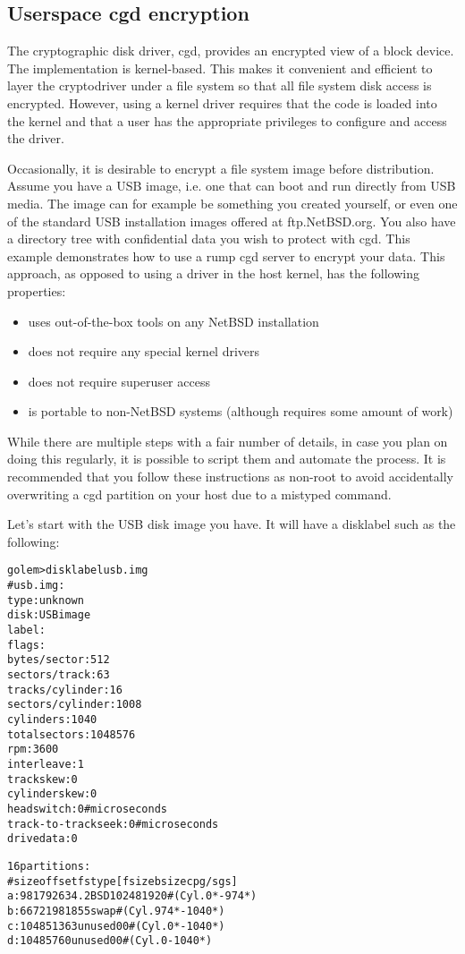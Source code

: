 \subsection{Userspace cgd encryption}
\label{sect:cgdencrypt}

The cryptographic disk driver, cgd,
provides an encrypted view of a block device.  The implementation
is kernel-based.  This makes it convenient and efficient to layer
the cryptodriver under a file system so that all file system disk
access is encrypted.  However, using a kernel driver requires that
the code is loaded into the kernel and that a user has the appropriate
privileges to configure and access the driver.

Occasionally, it is desirable to encrypt a file system image before
distribution.  Assume you have a USB image, i.e. one that can boot
and run directly from USB media.  The image can for example be
something you created yourself, or even one of the standard USB
installation images offered at ftp.NetBSD.org.  You also have a
directory tree with confidential data you wish to protect with cgd.
This example demonstrates how to use a rump cgd server to encrypt
your data.  This approach, as opposed to using a driver in the host
kernel, has the following properties:

\begin{itemize}
\item	uses out-of-the-box tools on any NetBSD installation
\item	does not require any special kernel drivers
\item	does not require superuser access
\item	is portable to non-NetBSD systems (although requires
	some amount of work)
\end{itemize}

While there are multiple steps with a fair number of details, in
case you plan on doing this regularly, it is possible to script
them and automate the process.  It is recommended that you follow
these instructions as non-root to avoid accidentally overwriting
a cgd partition on your host due to a mistyped command.

Let's start with the USB disk image you have.  It will have a
disklabel such as the following:

{\footnotesize
\begin{alltt}
golem> disklabel usb.img 
# usb.img:
type: unknown
disk: USB image
label: 
flags:
bytes/sector: 512
sectors/track: 63
tracks/cylinder: 16
sectors/cylinder: 1008
cylinders: 1040
total sectors: 1048576
rpm: 3600
interleave: 1
trackskew: 0
cylinderskew: 0
headswitch: 0           # microseconds
track-to-track seek: 0  # microseconds
drivedata: 0 

16 partitions:
#        size    offset     fstype [fsize bsize cpg/sgs]
 a:    981792        63     4.2BSD   1024  8192     0  # (Cyl.      0*-    974*)
 b:     66721    981855       swap                     # (Cyl.    974*-   1040*)
 c:   1048513        63     unused      0     0        # (Cyl.      0*-   1040*)
 d:   1048576         0     unused      0     0        # (Cyl.      0 -   1040*)
\end{alltt}}



